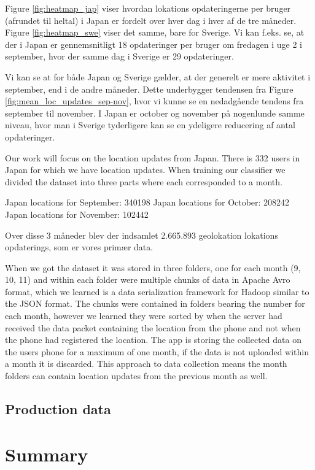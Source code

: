  Figure \ref{fig:heatmap_jap} viser hvordan lokations opdateringerne per bruger (afrundet til heltal) i Japan er fordelt over hver dag i hver af de tre måneder. Figure \ref{fig:heatmap_swe} viser det samme, bare for Sverige. 
 Vi kan f.eks. se, at der i Japan er gennemsnitligt 18 opdateringer per bruger om fredagen i uge 2 i september, hvor der samme dag i Sverige er 29 opdateringer. 

 Vi kan se at for både Japan og Sverige gælder, at der generelt er mere aktivitet i september, end i de andre måneder. Dette underbygger tendensen fra Figure \ref{fig:mean_loc_updates_sep-nov}, hvor vi kunne se en nedadgående tendens fra september til november. I Japan er october og november på nogenlunde samme niveau, hvor man i Sverige tyderligere kan se en ydeligere reducering af antal opdateringer. 

 
\newpage


Our work will focus on the location updates from Japan. There is 332 users in Japan for which we have location updates.
When training our classifier we divided the dataset into three parts where each corresponded to a month.

Japan locations for September: 340198
Japan locations for October: 208242
Japan locations for November: 102442



Over disse 3 måneder blev der indsamlet 2.665.893 geolokation lokations opdaterings, som er vores primær data. 

When we got the dataset it was stored in three folders, one for each month (9, 10, 11) and within each folder were multiple chunks of data in Apache Avro format\cite{apacheavro}, which we learned is a data serialization framework for Hadoop similar to the JSON format. The chunks were contained in folders bearing the number for each month, however we learned they were sorted by when the server had received the data packet containing the location from the phone and not when the phone had registered the location. The app is storing the collected data on the users phone for a maximum of one month, if the data is not uploaded within a month it is discarded. This approach to data collection means the month folders can contain location updates from the previous month as well.


\subsection{Production data}
\section{Summary}